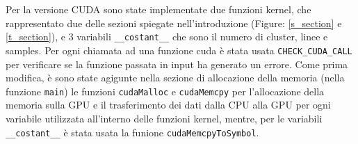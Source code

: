 \documentclass{article}
\begin{document}
  Per la versione CUDA sono state implementate due funzioni kernel, che rappresentato due delle sezioni spiegate nell'introduzione (Figure: \ref{s_section} e \ref{t_section}), e 3 variabili \verb|__costant__| che sono
  il numero di cluster, linee e samples. Per ogni chiamata ad una funzione cuda è stata usata \verb|CHECK_CUDA_CALL| per verificare se la funzione passata in input ha generato un errore.
  Come prima modifica, è sono state agigunte nella sezione di allocazione della memoria (nella funzione \verb|main|) le funzioni \verb|cudaMalloc| e \verb|cudaMemcpy| per l'allocazione della memoria sulla GPU e il trasferimento dei dati dalla CPU alla GPU per ogni
  variabile utilizzata all'interno delle funzioni kernel, mentre, per le variabili \verb|__costant__| è stata usata la funione \verb|cudaMemcpyToSymbol|.
  
\end{document}
